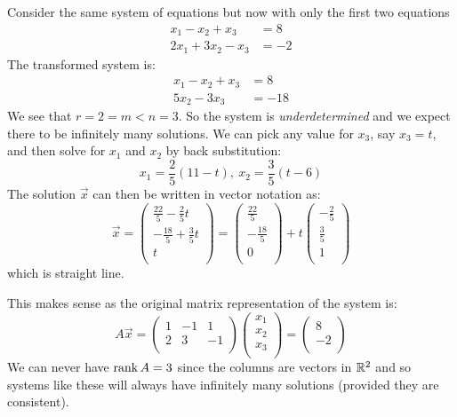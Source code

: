 \documentclass[../main.tex]{subfiles}
\begin{document}
\begin{example}
  Consider the same system of equations but now with only the first two equations
  \begin{align*}
    x_1 - x_2 + x_3 &= 8 \\
    2x_1 + 3x_2 - x_3 &= -2
  \end{align*}
  The transformed system is:
  \begin{align*}
    x_1 - x_2 + x_3 &= 8 \\
    5x_2 - 3x_3 &= -18
  \end{align*}
  We see that $r = 2 = m < n = 3$.
  So the system is \textit{underdetermined} and we expect there to be infinitely many solutions.
  We can pick any value for $x_3$, say $x_3 = t$, and then solve for $x_1$ and $x_2$ by back substitution:
  \[
    x_1 = \frac{2}{5}(11 - t),\ x_2 = \frac{3}{5}(t - 6)
  \]
  The solution $\vec{x}$ can then be written in vector notation as:
  \[
    \vec{x} = \begin{pmatrix}
    \frac{22}{5} - \frac{2}{5}t \\
    -\frac{18}{5} + \frac{3}{5}t \\
    t \\
    \end{pmatrix} = \begin{pmatrix}
    \frac{22}{5} \\
    -\frac{18}{5} \\
    0 \\
    \end{pmatrix} + t \begin{pmatrix}
    -\frac{2}{5} \\
    \frac{3}{5} \\
    1 \\
    \end{pmatrix}
  \]
  which is straight line.

  This makes sense as the original matrix representation of the system is:
  \[
    A\vec{x} = \begin{pmatrix}
    1 & -1 & 1 \\
    2 & 3 & -1 \\
    \end{pmatrix} \begin{pmatrix}
    x_1 \\
    x_2 \\
    x_3 \\
    \end{pmatrix} = \begin{pmatrix}
    8 \\
    -2 \\
    \end{pmatrix}
  \]
  We can never have $\operatorname{rank} A = 3$ since the columns are vectors in $\mathbb{R}^2$ and so systems like these will always have infinitely many solutions (provided they are consistent).


\end{example}
\end{document}
